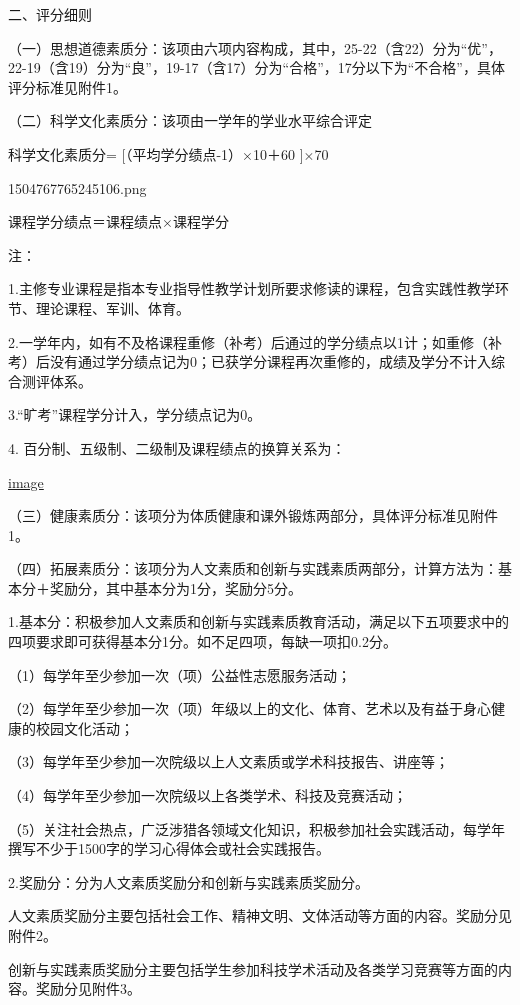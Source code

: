 \documentclass[UTF8,12pt,a4paper]{report}
\begin{document}
二、评分细则

（一）思想道德素质分：该项由六项内容构成，其中，25-22（含22）分为“优”，22-19（含19）分为“良”，19-17（含17）分为“合格”，17分以下为“不合格”，具体评分标准见附件1。

（二）科学文化素质分：该项由一学年的学业水平综合评定

科学文化素质分= [（平均学分绩点-1）$\times$10＋60 ]$\times$70%

1504767765245106.png

课程学分绩点＝课程绩点$\times$课程学分

注：

1.主修专业课程是指本专业指导性教学计划所要求修读的课程，包含实践性教学环节、理论课程、军训、体育。

2.一学年内，如有不及格课程重修（补考）后通过的学分绩点以1计；如重修（补考）后没有通过学分绩点记为0；已获学分课程再次重修的，成绩及学分不计入综合测评体系。

3.“旷考”课程学分计入，学分绩点记为0。

4. 百分制、五级制、二级制及课程绩点的换算关系为：

\href{http://img01.fs.yiban.cn/out/thumb_550x0/aHR0cDovL3lmczAxLmZzLnlpYmFuLmNuL3dlYi83NTg4OTE0L3VwbG9hZC8xNTA0NzY5Mjc4NTE2NTc3LnBuZw==}{image}

（三）健康素质分：该项分为体质健康和课外锻炼两部分，具体评分标准见附件1。

（四）拓展素质分：该项分为人文素质和创新与实践素质两部分，计算方法为：基本分＋奖励分，其中基本分为1分，奖励分5分。

1.基本分：积极参加人文素质和创新与实践素质教育活动，满足以下五项要求中的四项要求即可获得基本分1分。如不足四项，每缺一项扣0.2分。

（1）每学年至少参加一次（项）公益性志愿服务活动；

（2）每学年至少参加一次（项）年级以上的文化、体育、艺术以及有益于身心健康的校园文化活动；

（3）每学年至少参加一次院级以上人文素质或学术科技报告、讲座等；

（4）每学年至少参加一次院级以上各类学术、科技及竞赛活动；

（5）关注社会热点，广泛涉猎各领域文化知识，积极参加社会实践活动，每学年撰写不少于1500字的学习心得体会或社会实践报告。

2.奖励分：分为人文素质奖励分和创新与实践素质奖励分。

人文素质奖励分主要包括社会工作、精神文明、文体活动等方面的内容。奖励分见附件2。

创新与实践素质奖励分主要包括学生参加科技学术活动及各类学习竞赛等方面的内容。奖励分见附件3。
\end{document}
